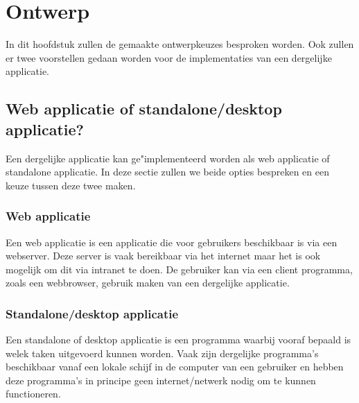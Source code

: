 \documentclass[twoside,openright]{uva-bachelor-thesis}
\begin{document}
\chapter{Ontwerp}
	In dit hoofdstuk zullen de gemaakte ontwerpkeuzes besproken worden. Ook zullen er twee voorstellen gedaan worden voor de implementaties van een dergelijke applicatie.
	\section{Web applicatie of standalone/desktop applicatie?}
		Een dergelijke applicatie kan ge"implementeerd worden als web applicatie of standalone applicatie. In deze sectie zullen we beide opties bespreken en een keuze tussen deze twee maken.
		\subsection{Web applicatie}
			Een web applicatie is een applicatie die voor gebruikers beschikbaar is via een webserver. Deze server is vaak bereikbaar via het internet maar het is ook mogelijk om dit via intranet te doen. De gebruiker kan via een client programma, zoals een webbrowser, gebruik maken van een dergelijke applicatie.
		\subsection{Standalone/desktop applicatie}
			Een standalone of desktop applicatie is een programma waarbij vooraf bepaald is welek taken uitgevoerd kunnen worden. Vaak zijn dergelijke programma's beschikbaar vanaf een lokale schijf in de computer van een gebruiker en hebben deze programma's in principe geen internet/netwerk nodig om te kunnen functioneren.
\end{document}
